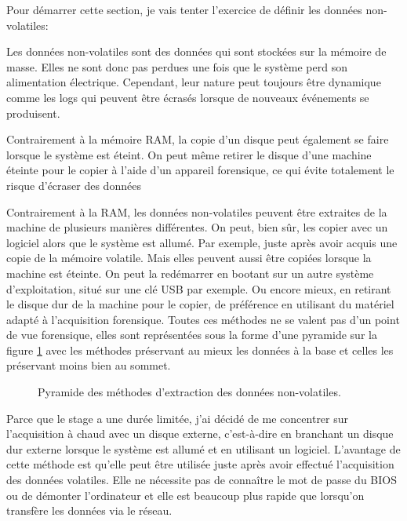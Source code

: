 Pour démarrer cette section, je vais tenter l'exercice de définir les données non-volatiles:

\begin{customquote}
    \hspace{0.45cm} Les données non-volatiles sont des données qui sont stockées sur la mémoire de masse. Elles ne sont donc pas perdues une fois que le système perd son alimentation électrique. Cependant, leur nature peut toujours être dynamique comme les logs qui peuvent être écrasés lorsque de nouveaux événements se produisent.
\end{customquote}

Contrairement à la mémoire RAM, la copie d'un disque peut également se faire lorsque le système est éteint. On peut même retirer le disque d'une machine éteinte pour le copier à l'aide d'un appareil forensique, ce qui évite totalement le risque d'écraser des données

Contrairement à la RAM, les données non-volatiles peuvent être extraites de la machine de plusieurs manières différentes. On peut, bien sûr, les copier avec un logiciel alors que le système est allumé. Par exemple, juste après avoir acquis une copie de la mémoire volatile. Mais elles peuvent aussi être copiées lorsque la machine est éteinte. On peut la redémarrer en bootant sur un autre système d'exploitation, situé sur une clé USB par exemple. Ou encore mieux, en retirant le disque dur de la machine pour le copier, de préférence en utilisant du matériel adapté à l'acquisition forensique. Toutes ces méthodes ne se valent pas d'un point de vue forensique, elles sont représentées sous la forme d'une pyramide sur la figure \ref{fig:non-volatile-memory} avec les méthodes préservant au mieux les données à la base et celles les préservant moins bien au sommet.

\begin{figure}
    \centering
    \makebox[\textwidth]{
        \resizebox{16cm}{!}{
            
        }
    }
    \caption{Pyramide des méthodes d'extraction des données non-volatiles.}
    \label{fig:non-volatile-memory}
\end{figure}

Parce que le stage a une durée limitée, j'ai décidé de me concentrer sur l'acquisition à chaud avec un disque externe, c'est-à-dire en branchant un disque dur externe lorsque le système est allumé et en utilisant un logiciel. L'avantage de cette méthode est qu'elle peut être utilisée juste après avoir effectué l'acquisition des données volatiles. Elle ne nécessite pas de connaître le mot de passe du BIOS ou de démonter l'ordinateur et elle est beaucoup plus rapide que lorsqu'on transfère les données via le réseau.



